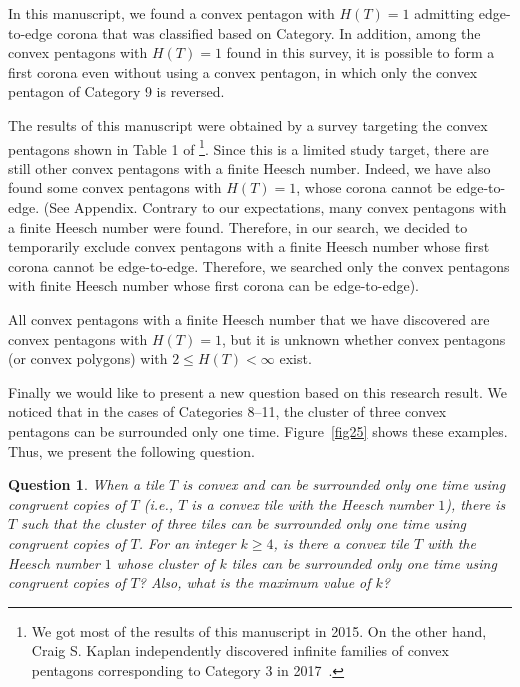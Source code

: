 \documentclass[11pt, a4paper]{article}
\newtheorem*{ques*}{Question}
\begin{document}
In this manuscript, we found a convex pentagon with $H(T) = 1$ admitting 
edge-to-edge corona that was classified based on Category. In addition, 
among the convex pentagons with $H(T) = 1$ found in this survey, it is 
possible to form a first corona even without using a convex pentagon, in 
which only the convex pentagon of Category 9 is reversed.

The results of this manuscript were obtained by a survey targeting the 
convex pentagons shown in Table 1 of \cite{Sugimoto_2015}\footnote{ We got 
most of the results of this manuscript in 2015. On the other hand, Craig S. Kaplan 
independently discovered infinite families of convex pentagons corresponding to 
Category 3 in 2017~\cite{Kaplan_2017_p4}.}. Since this is a limited study target, 
there are still other convex pentagons with a finite Heesch number. Indeed, we 
have also found some convex pentagons with $H(T) = 1$, whose corona cannot 
be edge-to-edge. (See Appendix. Contrary to our expectations, many convex
 pentagons with a finite Heesch number were found. Therefore, in our search, 
we decided to temporarily exclude convex pentagons with a finite Heesch 
number whose first corona cannot be edge-to-edge. Therefore, we searched 
only the convex pentagons with finite Heesch number whose first corona 
can be edge-to-edge).

All convex pentagons with a finite Heesch number that we have discovered are 
convex pentagons with $H(T) = 1$, but it is unknown whether convex pentagons 
(or convex polygons) with $2 \le H(T) < \infty $ exist.




Finally we would like to present a new question based on this research 
result. We noticed that in the cases of Categories 8--11, the cluster of 
three convex pentagons can be surrounded only one time. Figure~\ref{fig25} 
shows these examples. Thus, we present the following question.


\begin{ques*} 
When a tile $T$ is convex and can be surrounded only one 
time using congruent copies of $T$ (i.e., $T$ is a convex tile with the Heesch 
number $1$), there is $T$ such that the cluster of three tiles can be surrounded 
only one time using congruent copies of $T$. For an integer $k \ge 4$, is there a 
convex tile $T$ with the Heesch number $1$ whose cluster of $k$ tiles can be 
surrounded only one time using congruent copies of $T$? Also, what is the 
maximum value of $k$?
\end{ques*}
 
\end{document}
